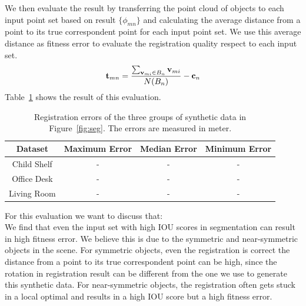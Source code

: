 We then evaluate the result by transferring the point cloud of objects to each input point set based on result $\{\phi_{mn}\}$ and calculating the average distance from a point to its true correspondent point for each input point set.
We use this average distance as fitness error to evaluate the registration quality respect to each input set.
\begin{equation}
\label{equ:error}
\mathbf{t}_{mn}=\frac{\sum_{\mathbf{v}_{mi} \in B_n}\mathbf{v}_{mi}}{N(B_n)}-\mathbf{c}_n
\end{equation}
Table~\ref{tab:regerror} shows the result of this evaluation.
\begin{table}
	\centering
	\caption{Registration errors of the three groups of synthetic data in Figure~\ref{fig:seg}. The errors are measured in meter. }
	\begin{tabular}{c c c c}
		Dataset & Maximum Error & Median Error & Minimum Error \\
		\hline
		Child Shelf & - & - & - \\   
		Office Desk & -  & - & - \\
		Living Room & -  & - & -\\
	\end{tabular}
	\label{tab:regerror}
\end{table}
For this evaluation we want to discuss that:\\
We find that even the input set with high IOU scores in segmentation can result in high fitness error. We believe this is due to the symmetric and near-symmetric objects in the scene. For symmetric objects, even the registration is correct the distance from a point to its true correspondent point can be high, since the rotation in registration result can be different from the one we use to generate this synthetic data. For near-symmetric objects, the registration often gets stuck in a local optimal and results in a high IOU score but a high fitness error.
